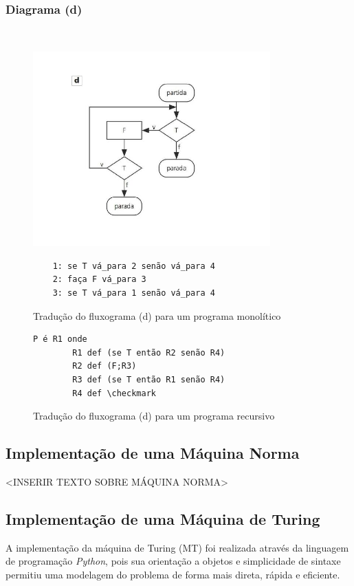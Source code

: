 \documentclass[12pt,fleqn]{article}
\begin{document}
\subsubsection{Diagrama (d)}
~
\begin{figure}[H]
    \centering
    \includegraphics[height=7.5cm]{img/diagrama_d}
\end{figure}
%
\begin{figure}[H]
\begin{verbatim}
    1: se T vá_para 2 senão vá_para 4
    2: faça F vá_para 3
    3: se T vá_para 1 senão vá_para 4
\end{verbatim}
\caption{Tradução do fluxograma (d) para um programa monolítico}
\end{figure}
%
\begin{figure}[H]
\begin{Verbatim}[commandchars=\\\{\},codes={\catcode`\$=3\catcode`\^=7}]
    P é R1 onde
        R1 def (se T então R2 senão R4)
        R2 def (F;R3)
        R3 def (se T então R1 senão R4)
        R4 def \checkmark
\end{Verbatim}
\caption{Tradução do fluxograma (d) para um programa recursivo}
\end{figure}

\subsection{Implementação de uma Máquina Norma}
<INSERIR TEXTO SOBRE MÁQUINA NORMA>

\subsection{Implementação de uma Máquina de Turing}
A implementação da máquina de Turing (MT) foi realizada através da linguagem de
programação \textit{Python}, pois sua orientação a objetos e simplicidade de
sintaxe permitiu uma modelagem do problema de forma mais direta, rápida e
eficiente.
\end{document}
